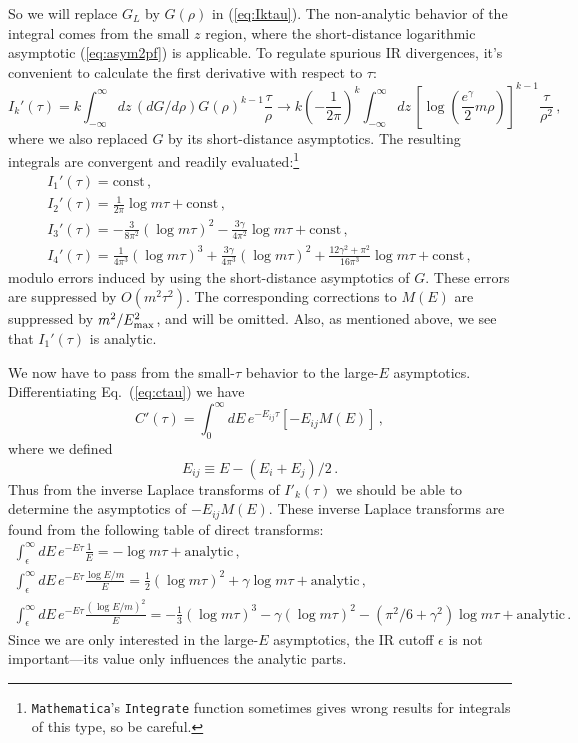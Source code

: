 \documentclass[11pt]{article}
\newcommand{\reef}[1]{(\ref{#1})}
\def\eps{\epsilon}
\newcommand{\beq}{\begin{equation}}
\newcommand{\eeq}{\end{equation}}
\def\nn{\nonumber}
\def \Emax{E_{\rm max}}
\numberwithin{equation}{section}
\begin{document}
So we will replace $G_L$ by $G(\rho)$ in \reef{eq:Iktau}. The non-analytic behavior of the integral comes from the small $z$ region, where the short-distance logarithmic asymptotic \reef{eq:asym2pf} is applicable. To regulate spurious IR divergences, it's convenient to calculate the first derivative with respect to $\tau$:
%
\begin{equation}
I_k'(\tau) = k \int_{-\infty}^\infty d z \,  (dG/d\rho) G(\rho)^{k-1} \frac{\tau}{\rho} 
\to k \left(-\frac{1}{2 \pi}\right)^k \int_{-\infty}^\infty dz \,  \left[ \log{\left(\frac{e^\gamma}{2} m \rho\right)}\right]^{k-1} \frac{\tau}{\rho^2}\,,
\end{equation}
%
where we also replaced $G$ by its short-distance asymptotics. The resulting integrals are convergent and readily evaluated:\footnote{{\tt Mathematica}'s {\tt Integrate} function sometimes gives wrong results for integrals of this type, so be careful.}
\begin{gather}
I_1'(\tau) = \mbox{const}\,,\nn
\\ I_2'(\tau) = \frac{1}{2 \pi} \log{m \tau} + \mbox{const}\,,\nn
\\ I_3'(\tau) = -\frac{3}{8 \pi^2} \left(\log{m\tau}\right)^2-\frac{3 \gamma}{4 \pi^2} \log{ m\tau }  + \mbox{const} \,,
\label{eq:I'}
\\ I_4'(\tau) = \frac{1}{4 \pi^3} \left(\log{m\tau}\right)^3+\frac{3 \gamma}{4 \pi^3} \left(\log{m\tau}\right)^2  +\frac{12 \gamma^2+\pi^2}{16 \pi^3} \log{m\tau}+ \mbox{const}\,\nn,
\end{gather}
modulo errors induced by using the short-distance asymptotics of $G$. These errors are suppressed by $O(m^2\tau^2)$. The corresponding corrections to $M(E)$ are suppressed by $m^2/\Emax^2$, and will be omitted. Also, as mentioned above, we see that $I_1'(\tau)$ is analytic. 

We now have to pass from the small-$\tau$ behavior to the large-$E$ asymptotics. Differentiating Eq.~(\ref{eq:ctau}) we have
\begin{equation}
\label{eq:ctauPrime}
C'(\tau)= \int_0^\infty d E\,  e^{-E_{i j}\tau} [-E_{i j} M(E)]\,,
\end{equation}
where we defined 
\beq
E_{i j} \equiv E - (E_i+E_j)/{2}\,.
\eeq
Thus from the inverse Laplace transforms of $I'_k(\tau)$ we should be able to determine the asymptotics of $-E_{i j} M(E)$. These inverse Laplace transforms are found from the following table of direct transforms:
\begin{gather}
\int_{\eps}^\infty dE\, e^{-E\tau}\frac 1E=-\log m\tau +\text{analytic}\,,\nn\\
\int_\eps^\infty dE\,e^{-E\tau} \frac {\log E/m}E=\frac 12(\log m\tau)^2+ \gamma\log m\tau +\text{analytic}\,,\\
\int_\eps^\infty dE\,e^{-E\tau} \frac {(\log E/m)^2}E=-\frac 13(\log m\tau)^3- \gamma(\log m\tau)^2-(\pi^2/6+\gamma^2)\log m\tau +\text{analytic}\,.\nn
\end{gather}
Since we are only interested in the large-$E$ asymptotics, the IR cutoff $\eps$ is not important---its value only influences the analytic parts.
\end{document}
